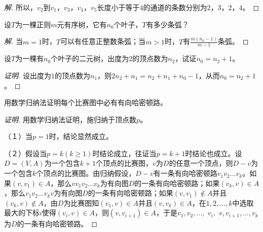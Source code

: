 \documentclass{article}
\begin{document}
\begin{CJK}{UTF8}{gbsn}
\begin{proof}[解]
所以，$v_2$到$v_1$，$v_3$，$v_4$，$v_5$长度小于等于$4$的通道的条数分别为$2$，$3$，$2$，$4$。
  
\end{proof}
\begin{Exercise}
  设$T$为一棵正则$m$元有序树，它有$n_0$个叶子，$T$有多少条弧？
\end{Exercise}
\begin{proof}[解]
  当$m=1$时，$T$可以有任意正整数条弧；当$m>1$时，$T$有$\frac{m(n_0-1)}{m-1}$条弧。
\end{proof}
\begin{Exercise}
  设$T$为一棵有$n_0$个叶子的二元树，出度为$2$的顶点数为$n_2$，试证$n_0=n_2+1$。
\end{Exercise}
\begin{proof}[证明]
  设出度为$1$的顶点数为$n_1$，则$2n_2+n_1=n_2+n_1+n_0-1$，从而$n_0=n_2+1$。
\end{proof}
\begin{Exercise}
  用数学归纳法证明每个比赛图中必有有向哈密顿路。
\end{Exercise}
\begin{proof}[证明]
  用数学归纳法证明，施归纳于顶点数$p$。

  （１）当$p=1$时，结论显然成立。

  （２）假设当$p=k(k\geq 1)$时结论成立，往证当$p=k+1$时结论也成立。设$D=(V,A)$为一个包含$k+1$个顶点的比赛图，$v$为$D$的任意一个顶点，则$D-v$为一个包含$k$个顶点的比赛图。由归纳假设，$D-v$有一条有向哈密顿路$v_1v_2\ldots v_k$。如果$(v,v_1)\in A$，那么$vv_1v_2\ldots v_k$为有向图$D$的一条有向哈密顿路；如果$(v_k,v)\in A$，那么$v_1v_2\ldots v_kv$为有向图$D$的一条有向哈密顿路；如果$(v,v_1)\notin A$并且$(v_k,v)\notin A$，由$D$为比赛图知$(v_1,v)\in A$并且$(v,v_k)\in A$，在$1,2,\ldots, k$中选取最大的下标$i$使得$(v_i,v)\in A$，则$(v,v_{i+1})\in A$，于是$v_1, v_2,\ldots,$ $v_i,$ $v,v_{i+1},\ldots,v_k$为$D$的一条有向哈密顿路。 
\end{proof}

\end{CJK}
\end{document}

